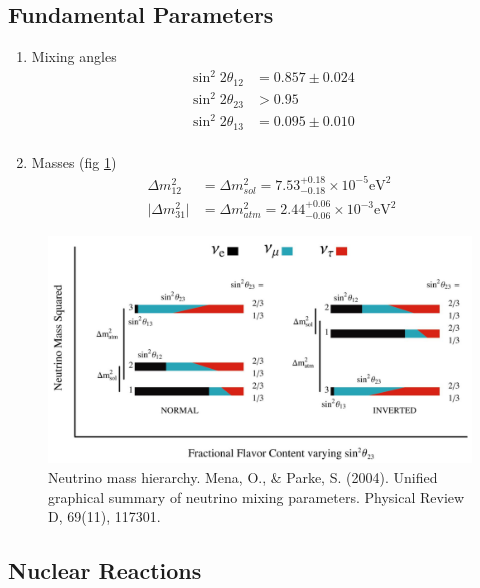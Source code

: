 \documentclass{sciposter}
\begin{document}
\begin{multicols}{3}
\subsection{Fundamental Parameters}

\begin{enumerate}
\item Mixing angles
\begin{align}
\sin^2 2\theta_{12} & = 0.857 \pm 0.024 \\
\sin^2 2\theta_{23} & > 0.95 \\
\sin^2 2\theta_{13} & = 0.095 \pm 0.010 \\
\end{align}
\item Masses (fig \ref{fig:neutrino_mass_hierarchy})
\begin{align}
\Delta m_{12}^2 &= \Delta m_{sol}^2 = 7.53_{-0.18}^{+0.18} \times 10^{-5} \mathrm{eV}^2 \\
\lvert\Delta m_{31}^2\rvert & = \Delta m_{atm}^2 = 2.44_{-0.06}^{+0.06}\times 10^{-3} \mathrm{eV^2}
\end{align}

\end{enumerate}




\begin{figure}[h]
\centering
\includegraphics[width=\columnwidth]{assets/neutrino-mass-theta23.png}
\caption{Neutrino mass hierarchy. Mena, O., \& Parke, S. (2004). Unified graphical summary of neutrino mixing parameters. Physical Review D, 69(11), 117301.}
\label{fig:neutrino_mass_hierarchy}
\end{figure}



\subsection{Nuclear Reactions}



\end{multicols}
\end{document}
